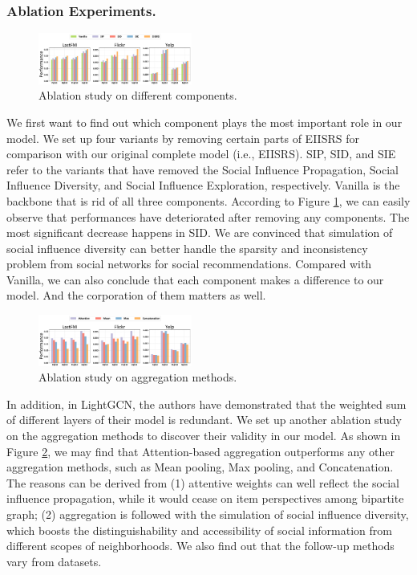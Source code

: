 \documentclass[letterpaper]{article} %
\begin{document}
\subsubsection{Ablation Experiments.}
\begin{figure}[ht!]
  \centering
  \includegraphics[width=0.45\textwidth]{ablation.pdf} %
  \caption{Ablation study on different components.}
  \label{fig_ablation}
\end{figure}
We first want to find out which component plays the most important role in our model. We set up four variants by removing certain parts of EIISRS for comparison with our original complete model (i.e., EIISRS). SIP, SID, and SIE refer to the variants that have removed the Social Influence Propagation, Social Influence Diversity, and Social Influence Exploration, respectively. Vanilla is the backbone that is rid of all three components. According to Figure \ref{fig_ablation}, we can easily observe that performances have deteriorated after removing any components. The most significant decrease happens in SID. We are convinced that simulation of social influence diversity can better handle the sparsity and inconsistency problem from social networks for social recommendations. Compared with Vanilla, we can also conclude that each component makes a difference to our model. And the corporation of them matters as well.
\begin{figure}[ht!]
  \centering
  \includegraphics[width=0.45\textwidth]{agg.pdf} %
  \caption{Ablation study on aggregation methods.}
  \label{fig_agg}
\end{figure}

In addition, in LightGCN, the authors have demonstrated that the weighted sum of different layers of their model is redundant. We set up another ablation study on the aggregation methods to discover their validity in our model. As shown in Figure \ref{fig_agg}, we may find that Attention-based aggregation outperforms any other aggregation methods, such as Mean pooling, Max pooling, and Concatenation. The reasons can be derived from (1) attentive weights can well reflect the social influence propagation, while it would cease on item perspectives among bipartite graph; (2) aggregation is followed with the simulation of social influence diversity, which boosts the distinguishability and accessibility of social information from different scopes of neighborhoods. We also find out that the follow-up methods vary from datasets. 
\end{document}
